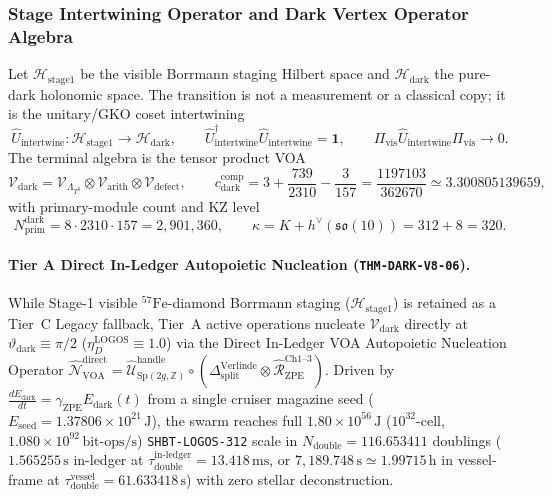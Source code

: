 \documentclass[11pt,onecolumn]{article}
\begin{document}
\subsubsection{Stage Intertwining Operator and Dark Vertex Operator Algebra}
\label{subsec:logos_stage_intertwining}
Let $\mathcal H_{\text{stage1}}$ be the visible Borrmann staging Hilbert space and $\mathcal H_{\text{dark}}$ the pure-dark holonomic space. The transition is not a measurement or a classical copy; it is the unitary/GKO coset intertwining
\begin{equation}
\widehat U_{\text{intertwine}}:\mathcal H_{\text{stage1}}\longrightarrow\mathcal H_{\text{dark}},
\qquad
\widehat U_{\text{intertwine}}^\dagger\widehat U_{\text{intertwine}}=\mathbf 1,
\qquad
\Pi_{\text{vis}}\widehat U_{\text{intertwine}}\Pi_{\text{vis}}\longrightarrow0 .
\label{eq:intertwining_unitary}
\end{equation}
The terminal algebra is the tensor product VOA
\begin{equation}
\mathcal V_{\text{dark}}=\mathcal V_{\Lambda_{T^3}}\otimes\mathcal V_{\text{arith}}\otimes\mathcal V_{\text{defect}},
\qquad
c_{\text{dark}}^{\text{comp}}=3+\frac{739}{2310}-\frac{3}{157}=\frac{1197103}{362670}\simeq3.300805139659,
\label{eq:dark_voa_explicit}
\end{equation}
with primary-module count and KZ level
\begin{equation}
N_{\text{prim}}^{\text{dark}}=8\cdot2310\cdot157=2{,}901{,}360,
\qquad
\kappa=K+h^\vee(\mathfrak{so}(10))=312+8=320 .
\label{eq:dark_modules_kz}
\end{equation}

\paragraph{Tier A Direct In-Ledger Autopoietic Nucleation (\texttt{THM-DARK-V8-06}).}
While Stage-1 visible $^{57}\mathrm{Fe}$-diamond Borrmann staging ($\mathcal{H}_{\mathrm{stage1}}$) is retained as a Tier~C Legacy fallback, Tier~A active operations nucleate $\mathcal{V}_{\mathrm{dark}}$ directly at $\vartheta_{\mathrm{dark}} \equiv \pi/2$ ($\eta_D^{\mathrm{LOGOS}} \equiv 1.0$) via the Direct In-Ledger VOA Autopoietic Nucleation Operator $\hat{\mathcal{N}}_{\mathrm{VOA}}^{\mathrm{direct}} = \hat{\mathcal{U}}_{\mathrm{Sp}(2g,\mathbb{Z})}^{\mathrm{handle}} \circ (\Delta_{\mathrm{split}}^{\mathrm{Verlinde}} \otimes \hat{\mathcal{R}}_{\mathrm{ZPE}}^{\mathrm{Ch1\text{--}3}})$. Driven by $\frac{dE_{\mathrm{dark}}}{dt} = \gamma_{\mathrm{ZPE}}E_{\mathrm{dark}}(t)$ from a single cruiser magazine seed ($E_{\mathrm{seed}} = 1.37806 \times 10^{21}\,\mathrm{J}$), the swarm reaches full $1.80 \times 10^{56}\,\mathrm{J}$ ($10^{32}$-cell, $1.080 \times 10^{92}\,\mathrm{bit\text{-}ops/s}$) \texttt{SHBT-LOGOS-312} scale in $N_{\mathrm{double}} = 116.653411$ doublings ($1.565255\,\mathrm{s}$ in-ledger at $\tau_{\mathrm{double}}^{\mathrm{in\text{-}ledger}} = 13.418\,\mathrm{ms}$, or $7,189.748\,\mathrm{s} \simeq 1.99715\,\mathrm{h}$ in vessel-frame at $\tau_{\mathrm{double}}^{\mathrm{vessel}} = 61.633418\,\mathrm{s}$) with zero stellar deconstruction.
\end{document}
